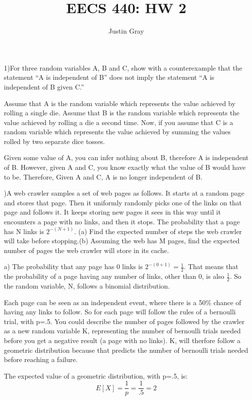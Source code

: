 \documentclass[12pt]{article}
\title{EECS 440: HW 2}
\author{Justin Gray}
\begin{document}
\maketitle

1)For three random variables A, B and C, show with a counterexample that the 
statement ``A is independent of B'' does not imply the statement ``A is 
independent of B given C.''

Assume that A is the random variable which represents the value achieved by 
rolling a single die. Assume that B is the random variable which represents the 
value achieved by rolling a die a second time. Now, if you assume that C is a 
random variable which represents the value achieved by summing the values rolled 
by two separate dice tosses. 

Given some value of A, you can infer nothing about B, therefore A is independent 
of B. However, given A and C, you know exactly what the value of B would have 
to be. Therefore, Given A and C, A is no longer independent of B. 

)A web crawler samples a set of web pages as follows. It starts at a random 
page and stores that page. Then it uniformly randomly picks one of the links 
on that page and follows it. It keeps storing new pages it sees in this way 
until it encounters a page with no links, and then it stops. The probability 
that a page has N links is $2^{-(N+1)}$. (a) Find the expected number of steps 
the web crawler will take before stopping.(b) Assuming the web has M pages, 
find the expected number of pages the web crawler will store in its cache.

a) The probability that any page has 0 links is $2^{-(0+1)} = \frac{1}{2}$. 
That means that the probability of a page having any number of links, other than 
0, is also $\frac{1}{2}$. So the random variable, N, follows a binomial 
distribution. 

Each page can be seen as an independent event, where there is a 50\% chance of 
having any links to follow. So for each page will follow the rules of a 
bernoulli trial, with p=.5. You could describe the number of pages 
followed by the crawler as a new random variable K, representing the number of
bernoulli trials needed before you get a negative result (a page with no links). 
K, will therfore follow a geometric distribution because that predicts the number 
of bernoulli trials needed before reaching a failure. 

The expected value of a geometric distribution, with p=.5, is: 
\begin{equation}
    E[X] =\frac{1}{p} = \frac{1}{.5} = 2
\end{equation}
\end{document}
